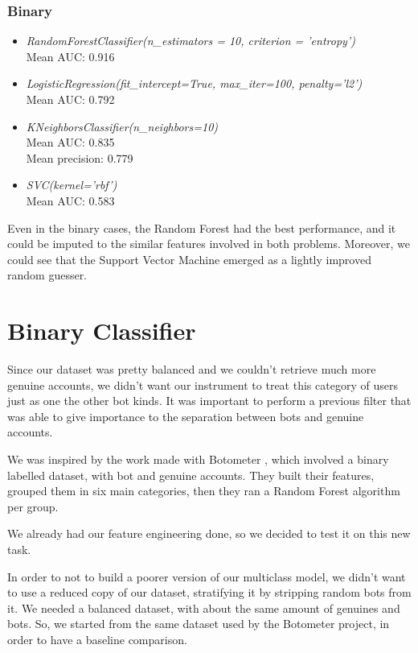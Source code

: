 \subsubsection{Binary}
\begin{itemize}
	\item[\PencilRight] \textit{RandomForestClassifier(n\_estimators = 10, criterion = 'entropy')}\\
	Mean AUC: 0.916\\
	\item[\PencilRight]\textit{LogisticRegression(fit\_intercept=True, max\_iter=100, penalty='l2')}\\
	Mean AUC: 0.792\\
	\item[\PencilRight]\textit{KNeighborsClassifier(n\_neighbors=10)}\\
	Mean AUC: 0.835\\
	Mean precision: 0.779\\
	\item[\PencilRight]\textit{SVC(kernel='rbf')}\\
	Mean AUC: 0.583\\
\end{itemize}
Even in the binary cases, the Random Forest had the best performance, and it could be imputed to the similar features involved in both problems. Moreover, we could see that the Support Vector Machine emerged as a lightly improved random guesser.


\section{Binary Classifier}
Since our dataset was pretty balanced and we couldn't retrieve much more genuine accounts, we didn't want our instrument to treat this category of users just as one the other bot kinds. It was important to perform a previous filter that was able to give importance to the separation between bots and genuine accounts.

We was inspired by the work made with Botometer \cite{Botometer}, which involved a binary labelled dataset, with bot and genuine accounts.
They built their features, grouped them in six main categories, then they ran a Random Forest algorithm per group.

We already had our feature engineering done, so we decided to test it on this new task.

In order to not to build a poorer version of our multiclass model, we didn't want to use a reduced copy of our dataset, stratifying it by stripping random bots from it. We needed a balanced dataset, with about the same amount of genuines and bots. So, we started from the same dataset used by the Botometer project, in order to have a baseline comparison.
